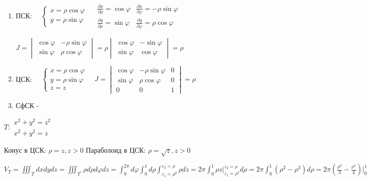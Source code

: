 \documentclass[12pt]{article}
\begin{document}
    \begin{enumerate}
        \item ПСК: $\quad \begin{cases}
                              x = \rho\cos\varphi \\ y = \rho\sin\varphi
        \end{cases} \quad
        \begin{matrix}
            \frac{\partial x}{\partial \rho} = \cos\varphi & \frac{\partial x}{\partial \varphi} = -\rho\sin\varphi \\
            \frac{\partial y}{\partial \rho} = \sin\varphi & \frac{\partial y}{\partial \varphi} = \rho\cos\varphi
        \end{matrix}$

        $J = \begin{vmatrix}\cos\varphi & -\rho\sin\varphi \\ \sin\varphi & \rho\cos\varphi\end{vmatrix} =
        \rho \begin{vmatrix}\cos\varphi & -\sin\varphi \\ \sin\varphi & \cos\varphi\end{vmatrix} = \rho$

        \item ЦСК: $\quad \begin{cases}
                              x = \rho\cos\varphi \\ y = \rho\sin\varphi \\ z = z
        \end{cases} \quad J = \begin{vmatrix}\cos\varphi & -\rho\sin\varphi & 0 \\ \sin\varphi & \rho\cos\varphi & 0 \\ 0 & 0 & 1\end{vmatrix} = \rho$

        \item СфСК - \Lab
    \end{enumerate}

    \Ex $T: \begin{matrix}x^2 + y^2 = z^2 \\ x^2 + y^2 = z\end{matrix}$

    Конус в ЦСК: $\rho = z, z > 0$
    Параболоид в ЦСК: $\rho = \sqrt{z}, z > 0$

    $V_T = \iiint_T dxdydz = \iiint_{T^\prime}\rho d\rho d\varphi dz = \int_0^{2\pi} d\varphi \int_0^1 d \rho \int_{z_1 = \rho^2}^{z_2=\rho} \rho dz =
    2\pi \int_0^1 \rho z \Big|_{z_1 = \rho^2}^{z_2=\rho} d\rho = 2\pi \int_0^1 (\rho^2 - \rho^3) d\rho =
    2\pi \left(\frac{\rho^3}{3} - \frac{\rho^4}{4}\right) \Big|_0^1 = 2\pi \left(\frac{1}{3} - \frac{1}{4}\right) = \frac{\pi}{6}$
\end{document}

